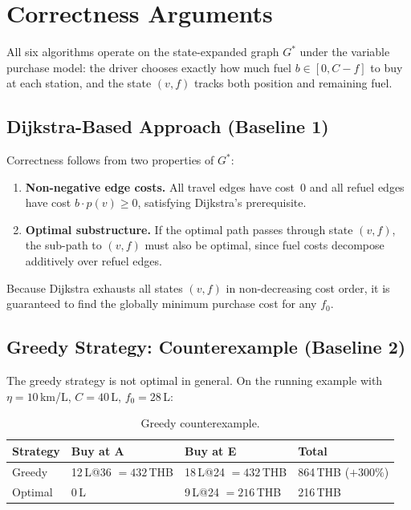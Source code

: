 \chapter{Correctness Arguments}
\label{ch:correctness}

All six algorithms operate on the state-expanded graph $G^{*}$ under the variable purchase
model: the driver chooses exactly how much fuel $b \in [0, C-f]$ to buy at each station, and
the state $(v,f)$ tracks both position and remaining fuel.

\section{Dijkstra-Based Approach (Baseline 1)}

Correctness follows from two properties of $G^{*}$:
\begin{enumerate}
    \item \textbf{Non-negative edge costs.}
          All travel edges have cost~0 and all refuel edges have cost $b \cdot p(v) \geq 0$,
          satisfying Dijkstra's prerequisite.
    \item \textbf{Optimal substructure.}
          If the optimal path passes through state $(v,f)$, the sub-path to $(v,f)$ must also
          be optimal, since fuel costs decompose additively over refuel edges.
\end{enumerate}
Because Dijkstra exhausts all states $(v,f)$ in non-decreasing cost order, it is guaranteed
to find the globally minimum purchase cost for any $f_0$.

\section{Greedy Strategy: Counterexample (Baseline 2)}

The greedy strategy is not optimal in general.
On the running example with $\eta=10$\,km/L, $C=40$\,L, $f_0=28$\,L:

\begin{table}[ht]
\centering
\caption{Greedy counterexample.}
\label{tab:greedy_counter}
\begin{tabular}{llll}
\toprule
Strategy & Buy at A & Buy at E & Total \\
\midrule
Greedy  & 12\,L@36 $= 432$\,THB & 18\,L@24 $= 432$\,THB & 864\,THB ($+300\%$) \\
Optimal & 0\,L & 9\,L@24 $= 216$\,THB & 216\,THB \\
\bottomrule
\end{tabular}
\end{table}

